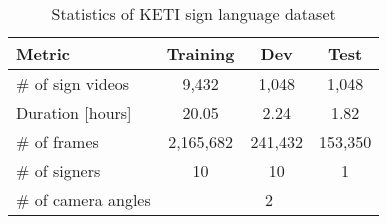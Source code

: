 \documentclass[10pt,twocolumn,letterpaper]{article}
\begin{document}




\begin{table}[htb]\label{tab:dataset}
\centering
\begin{tabular}{@{  }p{3.1cm}ccc@{  }}
\toprule
Metric  & Training & Dev & Test\\ \midrule
\# of sign videos  & 9,432 & 1,048 & 1,048  \\
Duration [hours]  & 20.05 & 2.24 & 1.82\\
\# of frames  & 2,165,682 & 241,432 & 153,350\\
\# of signers  & 10 & 10 & 1\\
\# of camera angles  & \multicolumn{3}{c}{2}\\
\bottomrule
\end{tabular}
\caption{Statistics of KETI sign language dataset}
\end{table}
\end{document}
